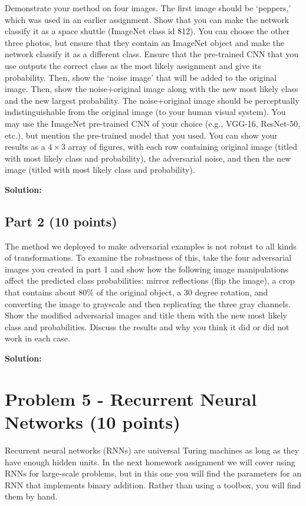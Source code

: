 \documentclass[11pt, oneside]{article}   	%
\begin{document}
Demonstrate your method on four images. The first image should be `peppers,' which was used in an earlier assignment. Show that you can make the network classify it as a space shuttle (ImageNet class id 812). You can choose the other three photos, but ensure that they contain an ImageNet object and make the network classify it as a different class. Ensure that the pre-trained CNN that you use outputs the correct class as the most likely assignment and give its probability. Then, show the `noise image' that will be added to the original image. Then, show the noise+original image along with the new most likely class and the new largest probability. The noise+original image should be perceptually indistinguishable from the original image (to your human visual system). You may use the ImageNet pre-trained CNN of your choice (e.g., VGG-16, ResNet-50, etc.), but mention the pre-trained model that you used. You can show your results as a $4 \times 3$ array of figures, with each row containing original image (titled with  most likely class and probability), the adversarial noise, and then the new image (titled with  most likely class and probability).




\textbf{Solution:}\\

\subsection*{Part 2 (10 points)}
The method we deployed to make adversarial examples is not robust to all kinds of transformations. To examine the robustness of this, take the four adversarial images you created in part 1 and show how the following image manipulations affect the predicted class probabilities: mirror reflections (flip the image), a crop that contains about 80\% of the original object, a 30 degree rotation, and converting the image to grayscale and then replicating the three gray channels. Show the modified adversarial images and title them with the new most likely class and probabilities. Discuss the results and why you think it did or did not work in each case. 


\textbf{Solution:}\\




\section*{Problem 5 - Recurrent Neural Networks (10 points)}
Recurrent neural networks (RNNs) are universal Turing machines as long as they have enough hidden units. In the next homework assignment we will cover using RNNs for large-scale problems, but in this one you will find the parameters for an RNN that implements binary addition. Rather than using a toolbox, you will find them by hand.
\end{document}
